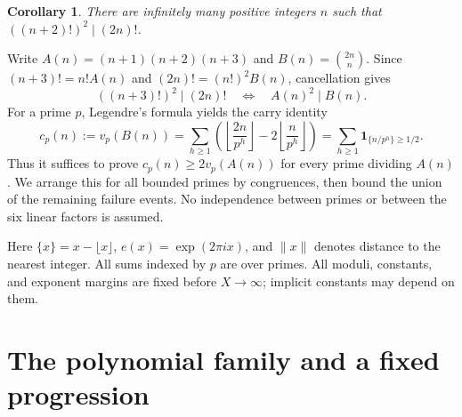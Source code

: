 \documentclass[11pt,a4paper]{article}
\newcommand{\1}{\mathbf 1}
\newtheorem{corollary}[theorem]{Corollary}
\numberwithin{equation}{section}
\begin{document}
\begin{corollary}\label{cor:k2}
There are infinitely many positive integers \(n\) such that
\(((n+2)!)^2\mid(2n)!\).
\end{corollary}

Write \(A(n)=(n+1)(n+2)(n+3)\) and \(B(n)=\binom{2n}{n}\).
Since \((n+3)!=n!A(n)\) and \((2n)!=(n!)^2B(n)\), cancellation gives
\begin{equation}\label{eq:cancel}
 ((n+3)!)^2\mid(2n)!\quad\Longleftrightarrow\quad A(n)^2\mid B(n).
\end{equation}
For a prime \(p\), Legendre's formula yields the carry identity
\begin{equation}\label{eq:carry}
 c_p(n):=v_p(B(n))
 =\sum_{h\geq1}\left(\left\lfloor\frac{2n}{p^h}\right\rfloor
       -2\left\lfloor\frac n{p^h}\right\rfloor\right)
 =\sum_{h\geq1}\1_{\{n/p^h\}\geq1/2}.
\end{equation}
Thus it suffices to prove \(c_p(n)\geq2v_p(A(n))\) for every prime dividing
\(A(n)\). We arrange this for all bounded primes by congruences, then bound
the union of the remaining failure events. No independence between primes
or between the six linear factors is assumed.

Here \(\{x\}=x-\lfloor x\rfloor\), \(e(x)=\exp(2\pi i x)\), and \(\|x\|\)
denotes distance to the nearest integer. All sums indexed by \(p\) are over
primes. All moduli, constants, and exponent margins are fixed before
\(X\to\infty\); implicit constants may depend on them.

\section{The polynomial family and a fixed progression}\label{sec:arithmetic}
\end{document}
